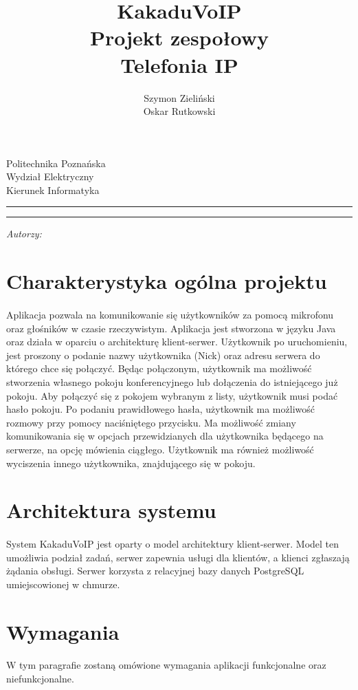 \documentclass[12pt,a4paper,notitlepage]{report}
\author{\Large{Szymon Zieliński \\ Oskar Rutkowski} }
\title{\textbf{KakaduVoIP} \\[1cm]  Projekt zespołowy  \\ Telefonia IP}
\makeatletter
\newcommand{\linia}{\rule{\linewidth}{0.5mm}}
\renewcommand{\maketitle}{\begin{titlepage}
		
		\vspace*{1cm}
		
		\begin{center}\small
			
			Politechnika Poznańska\\
			
			Wydział Elektryczny\\
			
			Kierunek Informatyka
			
		\end{center}
		
		\vspace{3cm}
		
		\linia
		
		\begin{center}
			
			\LARGE \textsc{\@title}
			
		\end{center}
		
		\linia
		
		\vspace{0.5cm}
		
		\begin{flushright}
			
			\begin{minipage}{5cm}
				
				\textit{ \Large{Autorzy:}}\\
				
				\normalsize{\@author} \par
				
			\end{minipage}
			
		\end{flushright}
		
		\vspace*{\stretch{6}}
		
		\begin{center}
			
			\@date
			
		\end{center}
		
	\end{titlepage}%
	
}
\makeatother
\begin{document}
	
	\maketitle
	\newpage
	\tableofcontents
	\newpage
	
	\section{Charakterystyka ogólna projektu}
	\paragraph*{} Aplikacja pozwala na komunikowanie się użytkowników za pomocą mikrofonu oraz głośników w czasie rzeczywistym. Aplikacja jest stworzona w języku Java oraz działa w oparciu o architekturę klient-serwer. Użytkownik po uruchomieniu, jest proszony o podanie nazwy użytkownika (Nick) oraz adresu serwera do którego chce się połączyć. Będąc połączonym, użytkownik ma możliwość stworzenia własnego pokoju konferencyjnego lub dołączenia do istniejącego już pokoju. Aby połączyć się z pokojem wybranym z listy, użytkownik musi podać hasło pokoju. Po podaniu prawidłowego hasła, użytkownik ma możliwość rozmowy przy pomocy naciśniętego przycisku. Ma możliwość zmiany komunikowania się w opcjach przewidzianych dla użytkownika będącego na serwerze, na opcję mówienia ciągłego. Użytkownik ma również możliwość wyciszenia innego użytkownika, znajdującego się w pokoju.
	\section{Architektura systemu}
	\paragraph*{} System KakaduVoIP jest oparty o model architektury klient-serwer. Model ten umożliwia podział zadań, serwer zapewnia usługi dla klientów, a klienci zgłaszają żądania obsługi. Serwer korzysta z relacyjnej bazy danych PostgreSQL umiejscowionej w chmurze.
	\section{Wymagania}
	\paragraph*{} W tym paragrafie zostaną omówione wymagania aplikacji funkcjonalne oraz niefunkcjonalne.
\end{document}
